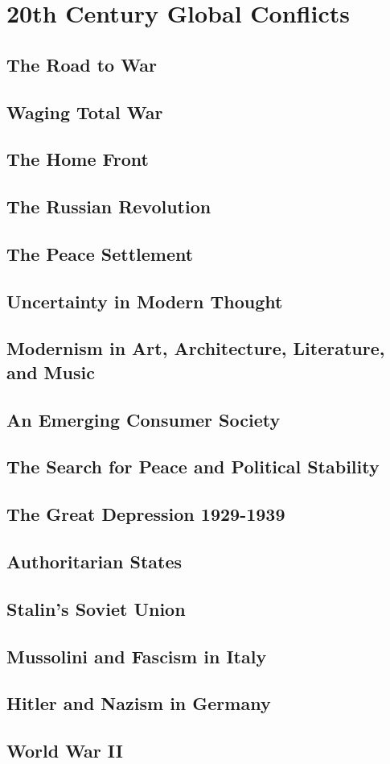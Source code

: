 \documentclass[../euro.tex]{subfiles}
\begin{document}
\chapter{20th Century Global Conflicts}
\section{The Road to War}
\section{Waging Total War}
\section{The Home Front}
\section{The Russian Revolution}
\section{The Peace Settlement}
\section{Uncertainty in Modern Thought}
\section{Modernism in Art, Architecture, Literature, and Music}
\section{An Emerging Consumer Society}
\section{The Search for Peace and Political Stability}
\section{The Great Depression 1929-1939}
\section{Authoritarian States}
\section{Stalin's Soviet Union}
\section{Mussolini and Fascism in Italy}
\section{Hitler and Nazism in Germany}
\section{World War II}
\end{document}
